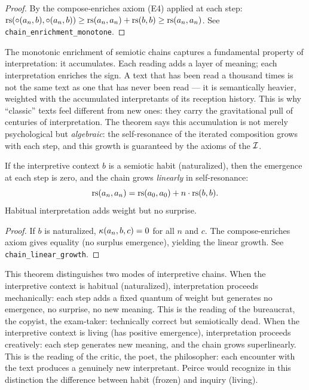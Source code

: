\begin{proof}
By the compose-enriches axiom (E4) applied at each step:
$\mathrm{rs}(\circ(a_n, b), \circ(a_n, b)) \geq \mathrm{rs}(a_n, a_n)
+ \mathrm{rs}(b, b) \geq \mathrm{rs}(a_n, a_n)$. See
\texttt{chain\_enrichment\_monotone}.
\end{proof}

\begin{interpretation}
The monotonic enrichment of semiotic chains captures a fundamental
property of interpretation: it accumulates. Each reading adds a layer
of meaning; each interpretation enriches the sign. A text that has
been read a thousand times is not the same text as one that has never
been read --- it is semantically heavier, weighted with the
accumulated interpretants of its reception history. This is why
``classic'' texts feel different from new ones: they carry the
gravitational pull of centuries of interpretation. The theorem says
this accumulation is not merely psychological but \emph{algebraic}:
the self-resonance of the iterated composition grows with each step,
and this growth is guaranteed by the axioms of the $\mathcal{I}$.
\end{interpretation}

\begin{theorem}
\label{thm:chain-convergence}
If the interpretive context $b$ is a semiotic habit (naturalized),
then the emergence at each step is zero, and the chain grows
\emph{linearly} in self-resonance:
\[
  \mathrm{rs}(a_n, a_n) = \mathrm{rs}(a_0, a_0) + n \cdot \mathrm{rs}(b, b).
\]
Habitual interpretation adds weight but no surprise.
\end{theorem}

\begin{proof}
If $b$ is naturalized, $\kappa(a_n, b, c) = 0$ for all $n$ and $c$.
The compose-enriches axiom gives equality (no surplus emergence),
yielding the linear growth. See \texttt{chain\_linear\_growth}.
\end{proof}

\begin{interpretation}
This theorem distinguishes two modes of interpretive chains. When the
interpretive context is habitual (naturalized), interpretation proceeds
mechanically: each step adds a fixed quantum of weight but generates
no emergence, no surprise, no new meaning. This is the reading of the
bureaucrat, the copyist, the exam-taker: technically correct but
semiotically dead. When the interpretive context is living (has
positive emergence), interpretation proceeds creatively: each step
generates new meaning, and the chain grows superlinearly. This is the
reading of the critic, the poet, the philosopher: each encounter with
the text produces a genuinely new interpretant. Peirce would
recognize in this distinction the difference between habit (frozen)
and inquiry (living).
\end{interpretation}



